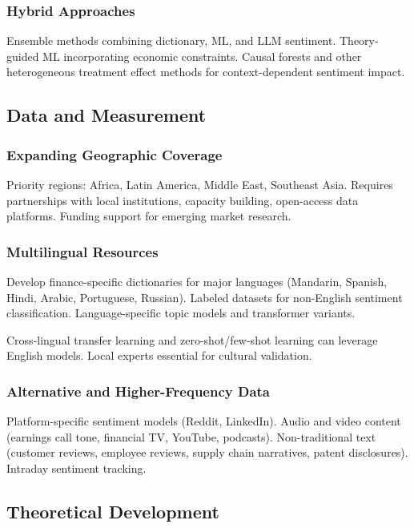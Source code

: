\documentclass[12pt,a4paper]{article}
\begin{document}
\subsubsection{Hybrid Approaches}

Ensemble methods combining dictionary, ML, and LLM sentiment. Theory-guided ML incorporating economic constraints. Causal forests and other heterogeneous treatment effect methods for context-dependent sentiment impact.

\subsection{Data and Measurement}

\subsubsection{Expanding Geographic Coverage}

Priority regions: Africa, Latin America, Middle East, Southeast Asia. Requires partnerships with local institutions, capacity building, open-access data platforms. Funding support for emerging market research.

\subsubsection{Multilingual Resources}

Develop finance-specific dictionaries for major languages (Mandarin, Spanish, Hindi, Arabic, Portuguese, Russian). Labeled datasets for non-English sentiment classification. Language-specific topic models and transformer variants.

Cross-lingual transfer learning and zero-shot/few-shot learning can leverage English models. Local experts essential for cultural validation.

\subsubsection{Alternative and Higher-Frequency Data}

Platform-specific sentiment models (Reddit, LinkedIn). Audio and video content (earnings call tone, financial TV, YouTube, podcasts). Non-traditional text (customer reviews, employee reviews, supply chain narratives, patent disclosures). Intraday sentiment tracking.

\subsection{Theoretical Development}
\end{document}
